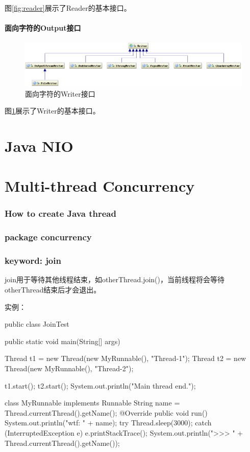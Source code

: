 \documentclass[a4paper,11pt]{article}
\begin{document}
图\ref{fig:reader}展示了Reader的基本接口。

\subsection[面向字符的Output接口]{面向字符的Output接口}
\begin{figure}
  \centering
  \includegraphics[width=.9\textwidth]{picturedir/writer.png}
  \caption{面向字符的Writer接口}
  \label{fig:writer}
\end{figure}

图\ref{fig:writer}展示了Writer的基本接口。



\part[Java NIO]{Java NIO}



\part[Multi-thread and Concurrency]{Multi-thread Concurrency}
\section[How to create Java thread]{How to create Java thread}

\section[package: concurrency]{package concurrency}

\section[keyword: join]{keyword: join}
join用于等待其他线程结束，如otherThread.join()，当前线程将会等待
otherThread结束后才会退出。

实例：

\begin{javacode}
public class JoinTest {
  public static void main(String[] args) {
    Thread t1 = new Thread(new MyRunnable(), "Thread-1");
    Thread t2 = new Thread(new MyRunnable(), "Thread-2");

    t1.start();
    t2.start();
    System.out.println("Main thread end.");
  }
}

class MyRunnable implements Runnable {
  String name = Thread.currentThread().getName();
  @Override
  public void run() {
    System.out.println("wtf: " + name);
    try {
      Thread.sleep(3000);
    } catch (InterruptedException e) {
      e.printStackTrace();
    }
    System.out.println(">>> " + Thread.currentThread().getName());
  }
}
\end{javacode}
\end{document}
